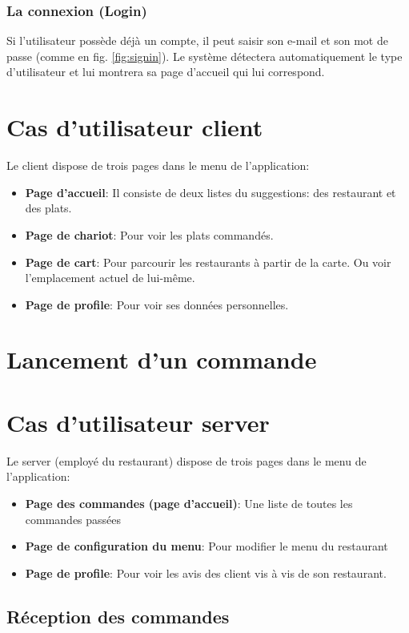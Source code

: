 \documentclass[french, a4paper, 12pt]{report}
\begin{document}
		\subsubsection{La connexion (Login)} Si l'utilisateur possède déjà un compte, il peut saisir son e-mail et son mot de passe (comme en fig. \ref{fig:signin}). Le système détectera automatiquement le type d'utilisateur et lui montrera sa page d'accueil qui lui correspond.
		 
	\newpage
	\section{Cas d'utilisateur client} Le client dispose de trois pages dans le menu de l'application:
		\begin{itemize}
			\item \textbf{Page d'accueil}: Il consiste de deux listes du suggestions: des restaurant et des plats.
			\item \textbf{Page de chariot}: Pour voir les plats commandés.
			\item \textbf{Page de cart}: Pour parcourir les restaurants à partir de la carte. Ou voir l'emplacement actuel de lui-même.
			\item \textbf{Page de profile}: Pour voir ses données personnelles.
		\end{itemize}
		\section{Lancement d'un commande}
	\newpage
	\section{Cas d'utilisateur server} Le server (employé du restaurant) dispose de trois pages dans le menu de l'application:
		\begin{itemize}
			\item \textbf{Page des commandes (page d'accueil)}: Une liste de toutes les commandes passées
			\item \textbf{Page de configuration du menu}: Pour modifier le menu du restaurant
			\item \textbf{Page de profile}: Pour voir les avis des client vis à vis de son restaurant.
		\end{itemize}
		
		\subsection{Réception des commandes}
		
\end{document}
